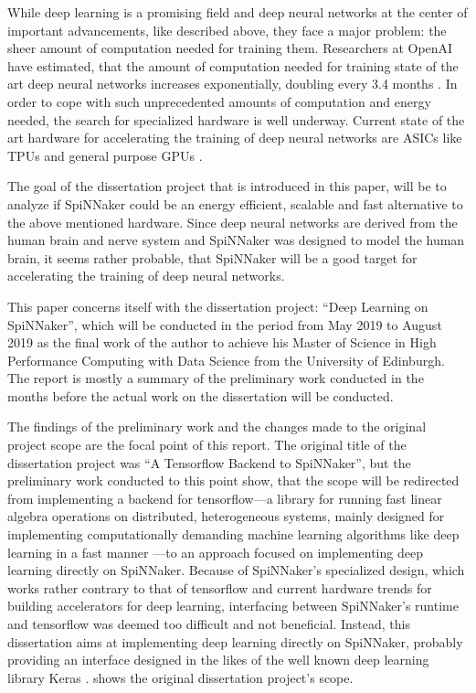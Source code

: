 \documentclass{article}
\begin{document}
While deep learning is a promising field and deep neural
networks at the center of important advancements, like
described above, they face a major problem: the sheer
amount of computation needed for training them.
Researchers at OpenAI have estimated, that the amount of
computation needed for training state of the art deep
neural networks increases exponentially, doubling every
3.4 months \citep{openai2019}.
In order to cope with such unprecedented amounts of
computation and energy needed, the search for specialized
hardware is well underway.
Current state of the art hardware for accelerating the
training of deep neural networks are ASICs like TPUs and
general purpose GPUs \citep{tpus, mittal_et_al_2019}.

The goal of the dissertation project that is introduced in
this paper, will be to analyze if SpiNNaker could be an
energy efficient, scalable and fast alternative to the
above mentioned hardware.
Since deep neural networks are derived from the human
brain and nerve system \citep{goodfellow2016} and SpiNNaker
was designed to model the human brain, it seems rather
probable, that SpiNNaker will be a good target for
accelerating the training of deep neural networks.

This paper concerns itself with the dissertation project:
``Deep Learning on SpiNNaker'', which will be conducted in
the period from May 2019 to August 2019 as the final work
of the author to achieve his Master of Science in
High Performance Computing with Data Science from the
University of Edinburgh.
The report is mostly a summary of the preliminary work
conducted in the months before the actual work on the
dissertation will be conducted.

The findings of the preliminary work and the changes made
to the original project scope are the focal point of this
report.
The original title of the dissertation project was ``A
Tensorflow Backend to SpiNNaker'', but the preliminary work
conducted to this point show, that the scope will be
redirected from implementing a backend for tensorflow---a
library for running fast linear algebra operations on
distributed, heterogeneous systems, mainly designed for
implementing computationally demanding machine learning
algorithms like deep learning in a fast manner
\citep{tf2015}---to an approach focused on implementing
deep learning directly on SpiNNaker.
Because of SpiNNaker's specialized design, which works
rather contrary to that of tensorflow and current hardware
trends for building accelerators for deep learning,
interfacing between SpiNNaker's runtime and tensorflow was
deemed too difficult and not beneficial.
Instead, this dissertation aims at implementing deep
learning directly on SpiNNaker, probably providing an
interface designed in the likes of the well known deep
learning library Keras \citep{keras}.
\citet{proj} shows the original dissertation project's
scope.
\end{document}
